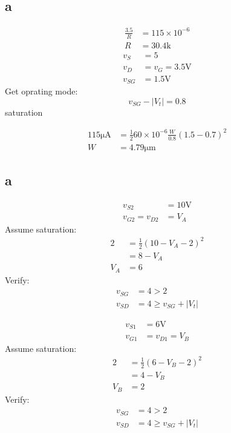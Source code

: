 \documentclass{article}
\begin{document}
\begin{multicols}{2}
    \subsection*{a}
    \begin{align*}
        \frac{3.5}{R} & = 115\times 10^{-6} \\
        R             & = 30.4\si{\kilo}
    \end{align*}
    \begin{align*}
        v_S    & = 5                    \\
        v_D    & = v_G = 3.5 \si{\volt} \\
        v_{SG} & = 1.5\si{\volt}
    \end{align*}
    Get oprating mode:
    \[
        v_{SG} - |V_t| = 0.8
    \]
    saturation

    \begin{align*}
        115\si{\micro\ampere} & = \frac{1}{2} 60\times 10^{-6} \frac{W}{0.8} {\left(1.5-0.7\right)}^2 \\
        W                     & = 4.79\si{\micro\meter}
    \end{align*}
    \subsection*{a}
    \begin{align*}
        v_{S2}          & = 10\si{\volt} \\
        v_{G2} = v_{D2} & = V_A
    \end{align*}
    Assume saturation:
    \begin{align*}
        2   & = \frac{1}{2} {\left( 10 - V_A - 2 \right)}^2 \\
            & = 8 - V_A                                     \\
        V_A & = 6
    \end{align*}
    Verify:
    \begin{align*}
        v_{SG} & = 4 > 2                 \\
        v_{SD} & = 4 \geq v_{SG} + |V_t|
    \end{align*}

    \begin{align*}
        v_{S1} & = 6 \si{\volt} \\
        v_{G1} & = v_{D1} = V_B
    \end{align*}
    Assume saturation:
    \begin{align*}
        2   & = \frac{1}{2} {\left( 6 - V_B - 2 \right)}^2 \\
            & = 4 - V_B                                    \\
        V_B & = 2
    \end{align*}
    Verify:
    \begin{align*}
        v_{SG} & = 4 > 2                 \\
        v_{SD} & = 4 \geq v_{SG} + |V_t|
    \end{align*}

\end{multicols}
\end{document}

